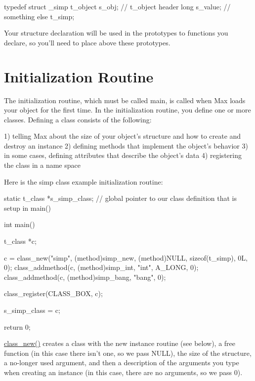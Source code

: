 \begin{DoxyCode}
    typedef struct _simp
    {
        t_object s_obj;     // t_object header
        long s_value;       // something else
    } t_simp;
\end{DoxyCode}


Your structure declaration will be used in the prototypes to functions you declare, so you'll need to place above these prototypes.\hypertarget{chapter_anatomy_chapter_anatomy_object_init}{}\section{Initialization Routine}\label{chapter_anatomy_chapter_anatomy_object_init}
The initialization routine, which must be called main, is called when Max loads your object for the first time. In the initialization routine, you define one or more classes. Defining a class consists of the following:

1) telling Max about the size of your object's structure and how to create and destroy an instance 2) defining methods that implement the object's behavior 3) in some cases, defining attributes that describe the object's data 4) registering the class in a name space

Here is the simp class example initialization routine:


\begin{DoxyCode}
    static t_class *s_simp_class; // global pointer to our class definition that 
      is setup in main()

    int main()
    {
        t_class *c;

        c = class_new("simp", (method)simp_new, (method)NULL, sizeof(t_simp), 0L,
       0);    
        class_addmethod(c, (method)simp_int, "int", A_LONG, 0);
        class_addmethod(c, (method)simp_bang, "bang", 0);

        class_register(CLASS_BOX, c);

        s_simp_class = c;
    
        return 0;
    }
\end{DoxyCode}


\hyperlink{group__class_ga238696d466081965c2b72b3880358404}{class\_\-new()} creates a class with the new instance routine (see below), a free function (in this case there isn't one, so we pass NULL), the size of the structure, a no-\/longer used argument, and then a description of the arguments you type when creating an instance (in this case, there are no arguments, so we pass 0).

